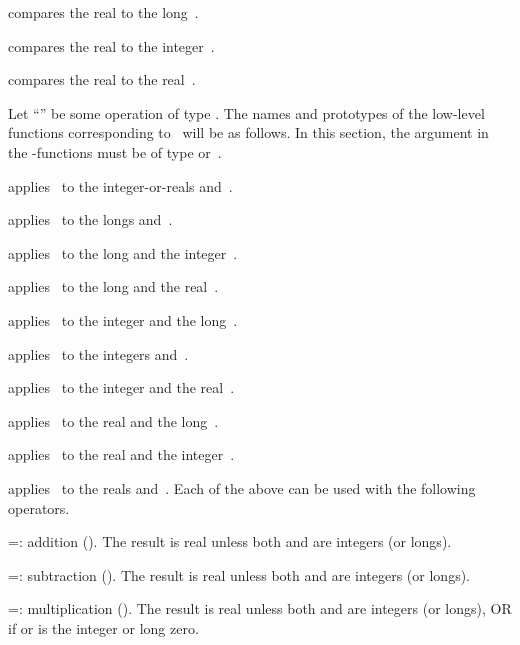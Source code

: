  compares the real  to the
long~.

 compares the real  to the
integer~.

 compares the real  to the real~.


\noindent
Let ``\op'' be some operation of type . The names and
prototypes of the low-level functions corresponding to \op\ will be as follows.
In this section, the  argument in the -functions must be of type
 or~.

 applies \op\ to
the integer-or-reals  and~.

 applies \op\ to the longs
 and~.

 applies \op\ to the long 
and the integer~.

 applies \op\ to the long 
and the real~.

 applies \op\ to the
integer  and the long~.

 applies \op\ to the
integers  and~.

 applies \op\ to the
integer  and the real~.

 applies \op\ to the real 
and the long~.

 applies \op\ to the real 
and the integer~.

 applies \op\ to the reals 
and~.
\smallskip
\noindent Each of the above can be used with the following operators.

\op=: addition (). The result is real unless both 
and  are integers (or longs).

\op=: subtraction (). The result is real unless both
 and  are integers (or longs).

\op=: multiplication (). The result is real unless both
 and  are integers (or longs), OR if  or  is the
integer or long zero.

